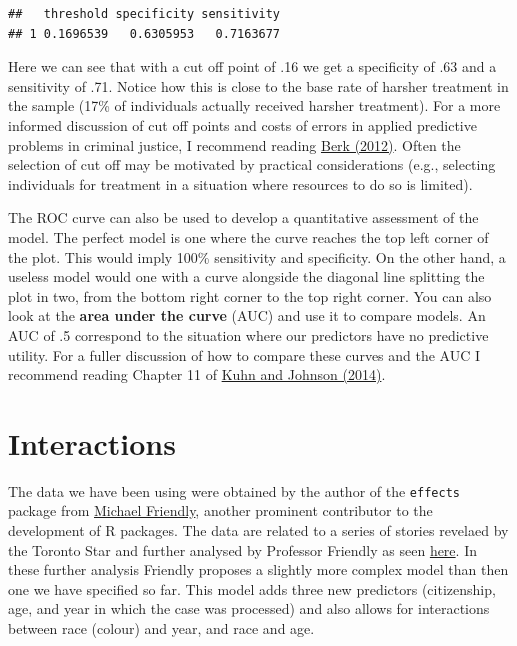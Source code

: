 \documentclass[
]{book}
\begin{document}
\begin{verbatim}
##   threshold specificity sensitivity
## 1 0.1696539   0.6305953   0.7163677
\end{verbatim}

Here we can see that with a cut off point of .16 we get a specificity of .63 and a sensitivity of .71. Notice how this is close to the base rate of harsher treatment in the sample (17\% of individuals actually received harsher treatment). For a more informed discussion of cut off points and costs of errors in applied predictive problems in criminal justice, I recommend reading \href{http://link.springer.com/book/10.1007\%2F978-1-4614-3085-8}{Berk (2012)}. Often the selection of cut off may be motivated by practical considerations (e.g., selecting individuals for treatment in a situation where resources to do so is limited).

The ROC curve can also be used to develop a quantitative assessment of the model. The perfect model is one where the curve reaches the top left corner of the plot. This would imply 100\% sensitivity and specificity. On the other hand, a useless model would one with a curve alongside the diagonal line splitting the plot in two, from the bottom right corner to the top right corner. You can also look at the \textbf{area under the curve} (AUC) and use it to compare models. An AUC of .5 correspond to the situation where our predictors have no predictive utility. For a fuller discussion of how to compare these curves and the AUC I recommend reading Chapter 11 of \href{http://link.springer.com/book/10.1007/978-1-4614-6849-3}{Kuhn and Johnson (2014)}.

\hypertarget{interactions}{%
\section{Interactions}\label{interactions}}

The data we have been using were obtained by the author of the \texttt{effects} package from \href{http://www.datavis.ca/}{Michael Friendly}, another prominent contributor to the development of R packages. The data are related to a series of stories revelaed by the Toronto Star and further analysed by Professor Friendly as seen \href{http://www.datavis.ca/courses/VCD/vcd4-handout-2x2.pdf}{here}. In these further analysis Friendly proposes a slightly more complex model than then one we have specified so far. This model adds three new predictors (citizenship, age, and year in which the case was processed) and also allows for interactions between race (colour) and year, and race and age.
\end{document}
